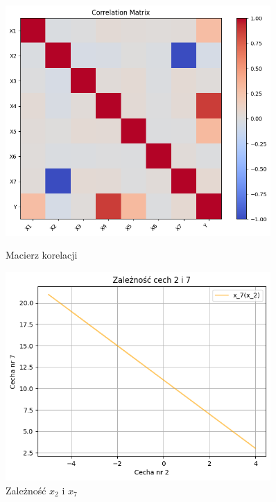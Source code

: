\documentclass[polish,12pt,a4paper]{extarticle}
\begin{document}
\begin{figure}[h!]
    \centering
    \begin{minipage}[b]{0.48\textwidth}
    \includegraphics[width=0.9\textwidth]{data/corr.png}
    \caption{Macierz korelacji}
    \end{minipage} \hspace{}
    \begin{minipage}[b]{0.48\textwidth}
    \includegraphics[width=0.9\textwidth]{data/linear27.png}
    \caption{Zależność $x_2$ i $x_7$}
    \end{minipage}
\end{figure} \\
\end{document}
